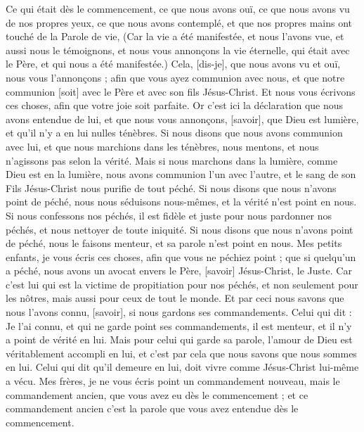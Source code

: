 \BFont
\begin{multicols}{2}
\VerseOne{}Ce qui était dès le commencement, ce que nous avons ouï, ce que nous avons vu de nos propres yeux, ce que nous avons contemplé, et que nos propres mains ont touché de la Parole de vie,
(Car la vie a été manifestée, et nous l'avons vue, et aussi nous le témoignons, et nous vous annonçons la vie éternelle, qui était avec le Père, et qui nous a été manifestée.)
Cela, [dis-je], que nous avons vu et ouï, nous vous l'annonçons ; afin que vous ayez communion avec nous, et que notre communion [soit] avec le Père et avec son fils Jésus-Christ.
Et nous vous écrivons ces choses, afin que votre joie soit parfaite.
Or c'est ici la déclaration que nous avons entendue de lui, et que nous vous annonçons, [savoir], que Dieu est lumière, et qu'il n'y a en lui nulles ténèbres.
Si nous disons que nous avons communion avec lui, et que nous marchions dans les ténèbres, nous mentons, et nous n'agissons pas selon la vérité.
Mais si nous marchons dans la lumière, comme Dieu est en la lumière, nous avons communion l'un avec l'autre, et le sang de son Fils Jésus-Christ nous purifie de tout péché.
Si nous disons que nous n'avons point de péché, nous nous séduisons nous-mêmes, et la vérité n'est point en nous.
Si nous confessons nos péchés, il est fidèle et juste pour nous pardonner nos péchés, et nous nettoyer de toute iniquité.
Si nous disons que nous n'avons point de péché, nous le faisons menteur, et sa parole n'est point en nous.
\VerseOne{}Mes petits enfants, je vous écris ces choses, afin que vous ne péchiez point ; que si quelqu'un a péché, nous avons un avocat envers le Père, [savoir] Jésus-Christ, le Juste.
Car c'est lui qui est la victime de propitiation pour nos péchés, et non seulement pour les nôtres, mais aussi pour ceux de tout le monde.
Et par ceci nous savons que nous l'avons connu, [savoir], si nous gardons ses commandements.
Celui qui dit : Je l'ai connu, et qui ne garde point ses commandements, il est menteur, et il n'y a point de vérité en lui.
Mais pour celui qui garde sa parole, l'amour de Dieu est véritablement accompli en lui, et c'est par cela que nous savons que nous sommes en lui.
Celui qui dit qu'il demeure en lui, doit vivre comme Jésus-Christ lui-même a vécu.
Mes frères, je ne vous écris point un commandement nouveau, mais le commandement ancien, que vous avez eu dès le commencement ; et ce commandement ancien c'est la parole que vous avez entendue dès le commencement.

\end{multicols}
